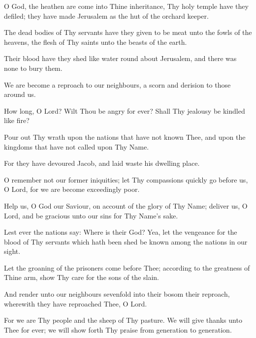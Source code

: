 O God, the heathen are come into Thine inheritance, Thy holy temple have they defiled; they have made Jerusalem as the hut of the orchard keeper.

The dead bodies of Thy servants have they given to be meat unto the fowls of the heavens, the flesh of Thy saints unto the beasts of the earth.

Their blood have they shed like water round about Jerusalem, and there was none to bury them.

We are become a reproach to our neighbours, a scorn and derision to those around us.

How long, O Lord? Wilt Thou be angry for ever? Shall Thy jealousy be kindled like fire?

Pour out Thy wrath upon the nations that have not known Thee, and upon the kingdoms that have not called upon Thy Name.

For they have devoured Jacob, and laid waste his dwelling place.

O remember not our former iniquities; let Thy compassions quickly go before us, O Lord, for we are become exceedingly poor.

Help us, O God our Saviour, on account of the glory of Thy Name; deliver us, O Lord, and be gracious unto our sins for Thy Name's sake.

Lest ever the nations say: Where is their God? Yea, let the vengeance for the blood of Thy servants which hath been shed be known among the nations in our sight.

Let the groaning of the prisoners come before Thee; according to the greatness of Thine arm, show Thy care for the sons of the slain.

And render unto our neighbours sevenfold into their bosom their reproach, wherewith they have reproached Thee, O Lord.

For we are Thy people and the sheep of Thy pasture. We will give thanks unto Thee for ever; we will show forth Thy praise from generation to generation.
